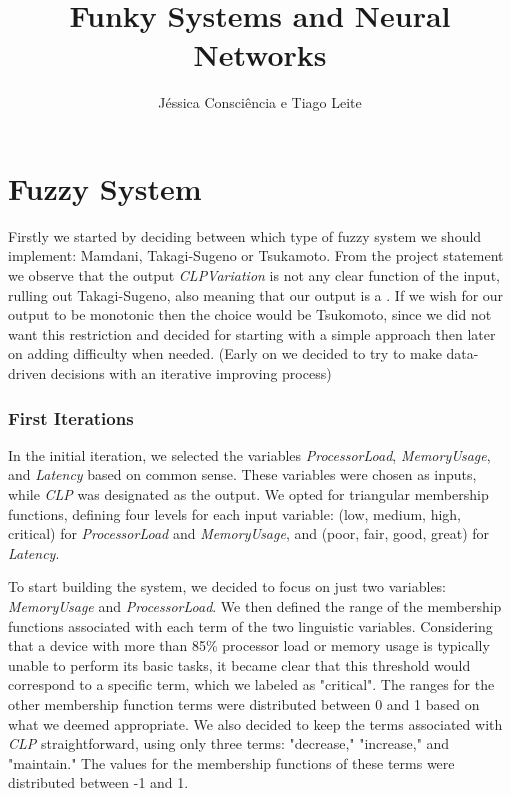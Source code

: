 \documentclass[11pt]{report}
\title{Funky Systems and Neural Networks}
\author{Jéssica Consciência e Tiago Leite}
\begin{document}
\maketitle
\newpage

\part{Fuzzy System}

Firstly we started by deciding between which type of fuzzy system
we should implement: Mamdani, Takagi-Sugeno or Tsukamoto. From the
project statement we observe that the output \textit{CLPVariation}
is not any clear function of the input, rulling out Takagi-Sugeno,
also meaning that our output is a . If we wish for
our output to be monotonic then the choice would be Tsukomoto, since
we did not want this restriction and decided for starting with a simple
approach then later on adding difficulty when needed.
(Early on we decided to try to make data-driven decisions with an iterative
improving process)

\section{First Iterations}

In the initial iteration, we selected the variables \textit{ProcessorLoad}, \textit{MemoryUsage}, and \textit{Latency} based on common sense.
These variables were chosen as inputs, while \textit{CLP} was designated as the output.
We opted for triangular membership functions, defining four levels for each input variable: (low, medium, high, critical) for \textit{ProcessorLoad} and \textit{MemoryUsage}, and (poor, fair, good, great) for \textit{Latency}.

To start building the system, we decided to focus on just two variables: \textit{MemoryUsage} and \textit{ProcessorLoad}.
We then defined the range of the membership functions associated with each term of the two linguistic variables.
Considering that a device with more than 85\% processor load or memory usage is typically unable to perform its basic tasks,
it became clear that this threshold would correspond to a specific term, which we labeled as "critical". The ranges for the other membership function terms were distributed between 0 and 1 based on what we deemed appropriate.
We also decided to keep the terms associated with \textit{CLP} straightforward, using only three terms: "decrease," "increase," and "maintain." The values for the membership functions of these terms were distributed between -1 and 1.
\end{document}
